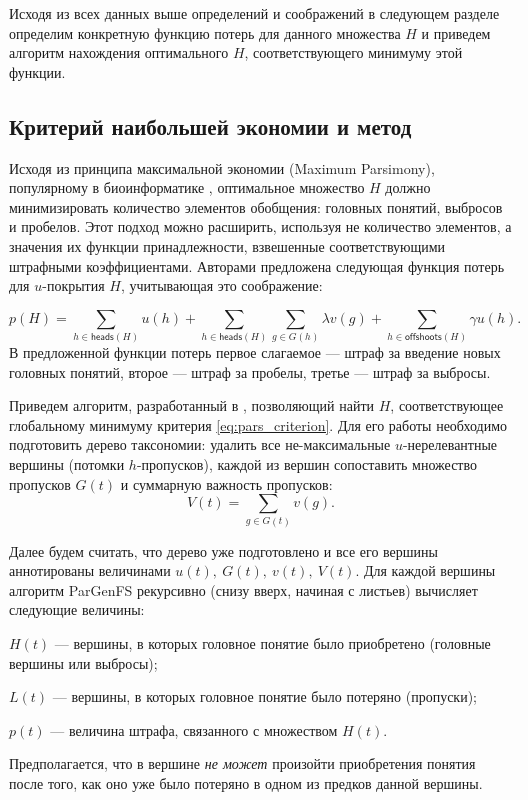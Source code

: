 \documentclass[12pt]{article}
\newenvironment{itemize*}%
{\begin{itemize}%
	\setlength{\itemsep}{0pt}%
	\setlength{\parskip}{0pt}}%
{\end{itemize}}
\let\oldsubsection\subsection
\renewcommand{\subsection}{\clearpage\oldsubsection}
\begin{document}
Исходя из всех данных выше определений и соображений в следующем разделе определим конкретную функцию потерь для данного множества $H$ и приведем алгоритм нахождения оптимального $H$, соответствующего минимуму этой функции.


\subsection{Критерий наибольшей экономии и метод}

Исходя из принципа максимальной экономии (Maximum Parsimony), популярному в биоинформатике \cite{robinson2011introduction}, оптимальное множество $H$ должно минимизировать количество элементов обобщения: головных понятий, выбросов и пробелов. Этот подход можно расширить, используя не количество элементов, а значения их функции принадлежности, взвешенные соответствующими штрафными коэффициентами. Авторами \cite{mirkin2018preprint} предложена следующая функция потерь для $u$-покрытия $H$, учитывающая это соображение:

\begin{equation}
	p(H)=\sum_{h\in \textsf{heads}(H)}u(h) + \sum_{h\in \textsf{heads}(H)}\sum_{g\in G(h)}\lambda v(g) + \sum_{h\in \textsf{offshoots}(H)}\gamma u(h).
	\label{eq:pars_criterion}
\end{equation}
В предложенной функции потерь первое слагаемое --- штраф за введение новых головных понятий, второе --- штраф за пробелы, третье --- штраф за выбросы.

Приведем алгоритм, разработанный в \cite{mirkin2018preprint}, позволяющий найти $H$, соответствующее глобальному минимуму критерия \eqref{eq:pars_criterion}. Для его работы необходимо подготовить дерево таксономии: удалить все не-максимальные $u$-нерелевантные вершины (потомки $h$-пропусков), каждой из вершин сопоставить множество пропусков $G(t)$ и суммарную важность пропусков:
\begin{equation}
	V(t)=\sum_{g\in G(t)}v(g).
	\label{eq:sum_gap_importance}
\end{equation}

Далее будем считать, что дерево уже подготовлено и все его вершины аннотированы величинами $u(t), \ G(t), \ v(t), \ V(t)$. Для каждой вершины алгоритм ParGenFS рекурсивно (снизу вверх, начиная с листьев) вычисляет следующие величины:
\begin{itemize*}
	\item $H(t)$ --- вершины, в которых головное понятие было приобретено (головные вершины или выбросы);
	\item $L(t)$ --- вершины, в которых головное понятие было потеряно (пропуски);
	\item $p(t)$ --- величина штрафа, связанного с множеством $H(t)$.
\end{itemize*}
Предполагается, что в вершине \emph{не может} произойти приобретения понятия после того, как оно уже было потеряно в одном из предков данной вершины.
\end{document}
